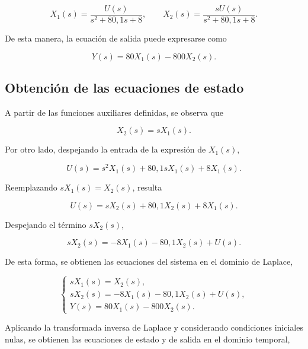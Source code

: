 \documentclass[10pt]{article}
\begin{document}
\begin{equation}
    X_1(s)=\frac{U(s)}{s^2+80{,}1s+8},
    \qquad
    X_2(s)=\frac{sU(s)}{s^2+80{,}1s+8}.
\end{equation}

De esta manera, la ecuación de salida puede expresarse como

\begin{equation}
    Y(s)=80X_1(s)-800X_2(s).
\end{equation}


\subsection{Obtención de las ecuaciones de estado}

A partir de las funciones auxiliares definidas,
se observa que

\begin{equation}
    X_2(s)=sX_1(s).
\end{equation}

Por otro lado, despejando la entrada de la expresión
de $X_1(s)$,

\begin{equation}
    U(s)=s^2X_1(s)+80{,}1sX_1(s)+8X_1(s).
\end{equation}

Reemplazando $sX_1(s)=X_2(s)$, resulta

\begin{equation}
    U(s)=sX_2(s)+80{,}1X_2(s)+8X_1(s).
\end{equation}

Despejando el término $sX_2(s)$,

\begin{equation}
    sX_2(s)=-8X_1(s)-80{,}1X_2(s)+U(s).
\end{equation}

De esta forma, se obtienen las ecuaciones del sistema
en el dominio de Laplace,

\begin{equation}
    \begin{cases}
        sX_1(s)=X_2(s),\\
        sX_2(s)=-8X_1(s)-80{,}1X_2(s)+U(s),\\
        Y(s)=80X_1(s)-800X_2(s).
    \end{cases}
\end{equation}

Aplicando la transformada inversa de Laplace y considerando
condiciones iniciales nulas, se obtienen las ecuaciones
de estado y de salida en el dominio temporal,
\end{document}
